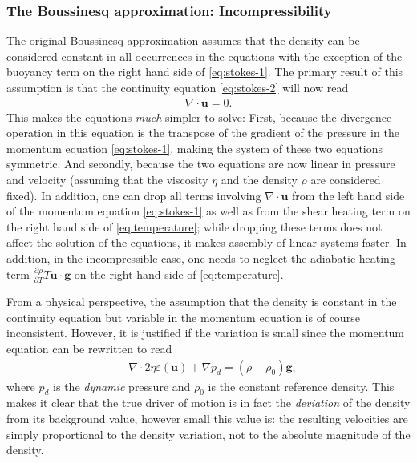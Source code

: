 \documentclass{article}
\begin{document}
\subsubsection{The Boussinesq approximation: Incompressibility}
\label{sec:boussinesq}

The original Boussinesq approximation assumes that the density can be
considered constant in all occurrences in the equations with the exception of
the buoyancy term on the right hand side of \eqref{eq:stokes-1}. The primary
result of this assumption is that the continuity equation \eqref{eq:stokes-2}
will now read
\begin{gather*}
  \nabla \cdot \mathbf u = 0.
\end{gather*}
This makes the equations \textit{much} simpler to solve: First, because the
divergence operation in this equation is the transpose of the gradient of the
pressure in the momentum equation \eqref{eq:stokes-1}, making the system of
these two equations symmetric. And secondly, because the two equations are now
linear in pressure and velocity (assuming that the viscosity $\eta$ and the
density $\rho$ are considered fixed). In addition, one can drop all terms
involving $\nabla \cdot \mathbf u$ from the left hand side of the momentum
equation \eqref{eq:stokes-1} as well as from the shear heating term on the
right hand side of \eqref{eq:temperature}; while dropping these terms does not
affect the solution of the equations, it makes assembly of linear systems
faster. In addition, in the incompressible case, one needs to neglect the
adiabatic heating term $\frac{\partial \rho}{\partial T} T \mathbf u \cdot
\mathbf g$ on the right hand side of \eqref{eq:temperature}.

From a physical perspective, the assumption that the density is constant in
the continuity equation but variable in the momentum equation is of course
inconsistent. However, it is justified if the variation is small since the
momentum equation can be rewritten to read
\begin{gather*}
  -\nabla \cdot 2\eta \varepsilon(\mathbf u) + \nabla p_d =
  (\rho-\rho_0) \mathbf g,
\end{gather*}
where $p_d$ is the \textit{dynamic} pressure and $\rho_0$ is the constant
reference density. This makes it clear that the true driver of motion is in
fact the \textit{deviation} of the density from its background value, however
small this value is: the resulting velocities are simply proportional to the
density variation, not to the absolute magnitude of the density.
\end{document}
